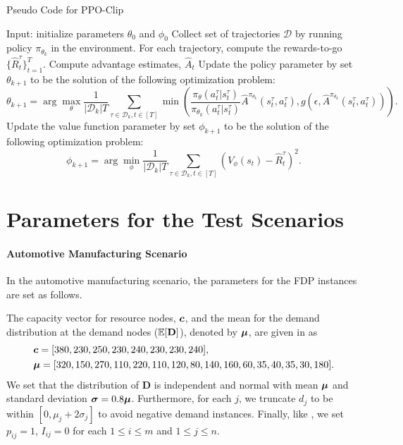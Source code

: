 \documentclass{article} %
\begin{document}
\begin{algorithm}[H]
    \caption{Pseudo Code for PPO-Clip}
    \label{alg:ppoclip}
\begin{algorithmic}[1]
    \STATE Input: initialize parameters $\theta_0$ and $\phi_0$
    \STATE Collect set of trajectories ${\mathcal D}$ by running policy $\pi_{\theta_k}$ in the environment.
    \STATE For each trajectory, compute the rewards-to-go $\{\hat{R}^\tau_t\}_{t=1}^T$.
    \STATE Compute advantage estimates, $\hat{A}_t$ %
    \STATE Update the policy parameter by set $\theta_{k+1}$ to be the solution of the following optimization problem:
    \begin{equation*} \theta_{k+1} = \arg\max_{\theta} \frac{1}{|{\mathcal D}_k| T} \sum_{\tau \in \mathcal{D}_k, t \in [T]} \min\left(
\frac{\pi_{\theta}(a^\tau_t|s^\tau_t)}{\pi_{\theta_k}(a^\tau_t|s^\tau_t)}\hat{A}^{\pi_{\theta_k}}(s^\tau_t,a^\tau_t), g(\epsilon, \hat{A}^{\pi_{\theta_k}}(s^\tau_t,a^\tau_t))
\right).
\end{equation*}
    \STATE Update the value function parameter by set $\phi_{k+1}$ to be the solution of the following optimization problem:
        \begin{equation*}
        \phi_{k+1} = \arg \min_{\phi} \frac{1}{|{\mathcal D}_k| T} \sum_{\tau \in {\mathcal D}_k, t\in [T]} \left( V_{\phi} (s_t) - \hat{R}^\tau_t \right)^2.
        \end{equation*}
    \ENDFOR
\end{algorithmic}
\end{algorithm}




\section{Parameters for the Test Scenarios}

\paragraph{Automotive Manufacturing Scenario}
In the automotive manufacturing scenario, the parameters for the FDP instances are set as follows.

The capacity vector for resource nodes, $\boldsymbol{c}$, and the mean for the demand distribution at the demand nodes ($\mathbb{E}[\mathbf{D}]$), denoted by $\boldsymbol{\mu}$, are given in \citet{JG95} as 
\begin{align*}
    &\boldsymbol{c} = [380, 230, 250, 230, 240, 230,230,240], \\
    &\boldsymbol{\mu} = [320, 150, 270, 110, 220, 110, 120, 80, 140, 160, 60, 35, 40, 35, 30, 180].
\end{align*}
We set that the distribution of $\mathbf{D}$ is independent and normal with mean $\boldsymbol{\mu}$ and standard deviation $\boldsymbol{\sigma} = 0.8\boldsymbol{\mu}$. Furthermore, for each $j$, we truncate $d_j$ to be within $[0, \mu_j + 2\sigma_j]$ to avoid negative demand instances. Finally, like \citet{JG95}, we set $p_{ij}=1$, $I_{ij}=0$ for each $1\leq i\leq m$ and $1 \leq j\leq n$. 
\end{document}
